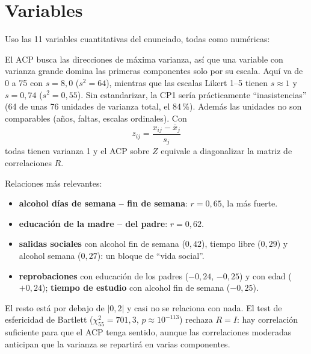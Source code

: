 \section*{Variables}
Uso las 11 variables cuantitativas del enunciado, todas como numéricas:

El ACP busca las direcciones de máxima varianza, así que una variable con varianza grande domina las
primeras componentes solo por su escala. Aquí  va de 0 a 75 con $s=8,0$ ($s^2=64$),
mientras que las escalas Likert 1--5 tienen $s\approx1$ y  $s=0,74$ ($s^2=0,55$).
Sin estandarizar, la CP1 sería prácticamente ``inasistencias'' (64 de unas 76 unidades de varianza
total, el 84\,\%). Además las unidades no son comparables (años, faltas, escalas ordinales). Con
\[
z_{ij}=\frac{x_{ij}-\bar x_j}{s_j}
\]
todas tienen varianza 1 y el ACP sobre $Z$ equivale a diagonalizar la matriz de correlaciones $R$.


Relaciones más relevantes:
\begin{itemize}[leftmargin=1.2em]
  \item[\color{cTeal}\faLink] \textbf{alcohol días de semana -- fin de semana}: $r=0,65$, la más fuerte.
  \item[\color{cTeal}\faLink] \textbf{educación de la madre -- del padre}: $r=0,62$.
  \item[\color{cTeal}\faLink] \textbf{salidas sociales} con alcohol fin de semana ($0,42$), tiempo libre ($0,29$)
  y alcohol semana ($0,27$): un bloque de ``vida social''.
  \item[\color{cRed}\faUnlink] \textbf{reprobaciones} con educación de los padres ($-0,24$, $-0,25$) y con
  edad ($+0,24$); \textbf{tiempo de estudio} con alcohol fin de semana ($-0,25$).
\end{itemize}
El resto está por debajo de $|0,2|$ y  casi no se relaciona con nada. El test de esfericidad de
Bartlett ($\chi^2_{55}=701,3$, $p\approx10^{-113}$) rechaza $R=I$: hay correlación suficiente para que el ACP
tenga sentido, aunque las correlaciones moderadas anticipan que la varianza se repartirá en varias componentes.

